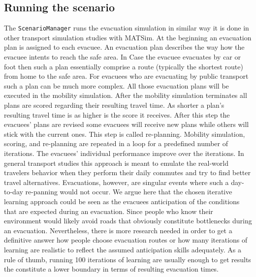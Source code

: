 \subsection{Running the scenario}
The \lstinline+ScenarioManager+ runs the evacuation simulation in similar way it is done in other transport simulation studies with MATSim. 
At the beginning an evacuation plan is assigned to each evacuee. 
An evacuation plan describes the way how the evacuee intents to reach the safe area.
In Case the evacuee evacuates by car or foot then such a plan essentially comprise a route (typically the shortest route) from home to the safe area. For evacuees who are evacuating by public transport such a plan can be much more complex. All those evacuation plans will be executed in the mobility simulation. After the mobility simulation terminates all plans are scored regarding their resulting travel time. 
As shorter a plan's resulting travel time is as higher is the score it receives. After this step the evacuees' plans are revised some evacuees will receive new plans while others will stick with the current ones. This step is called re-planning. Mobility simulation, scoring, and re-planning are repeated in a loop for a predefined number of iterations. The evacuees' individual performance improve over the iterations. 
In general transport studies this approach is meant to emulate the real-world travelers behavior when they perform their daily commutes and try to find better travel alternatives. Evacuations, however, are singular events where such a day-to-day re-panning would not occur. We argue here that the chosen iterative learning approach could be seen as the evacuees anticipation of the conditions that are expected during an evacuation. 
Since people who know their  environment would likely avoid roads that obviously constitute bottlenecks during an evacuation. Nevertheless, there is more research needed in order to get a definitive answer how people choose evacuation routes or how many iterations of learning are realistic to reflect the assumed anticipation skills adequately. As a rule of thumb, running 100 iterations of learning are usually enough to get results the constitute a lower boundary in terms of resulting evacuation times.

